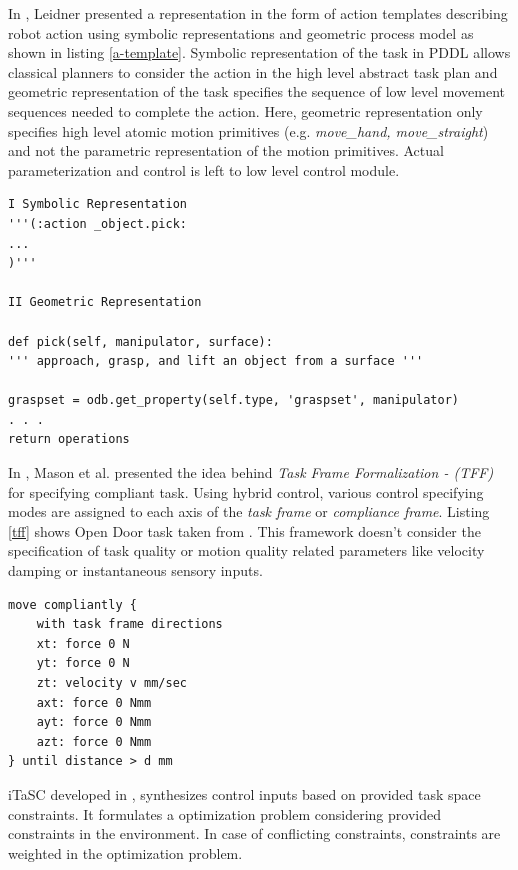 \documentclass[thesis]{mas_proposal}
\begin{document}
In \cite{leidner2017cognitive}, Leidner presented a representation in the form of action templates describing robot action using symbolic representations and geometric process model as shown in listing \ref{a-template}.  Symbolic representation of the task in PDDL allows classical planners to consider the action in the high level abstract task plan and geometric representation of the task specifies the sequence of low level movement sequences needed to complete the action. Here, geometric representation only specifies high level atomic motion primitives (e.g. \textit{move\_hand, move\_straight}) and not the parametric representation of the motion primitives. Actual parameterization and control is left to low level control module.   

\begin{lstlisting}[label=a-template,caption=Action Template: \_object.pick]
I Symbolic Representation 
'''(:action _object.pick: 
...
)'''

II Geometric Representation

def pick(self, manipulator, surface):
''' approach, grasp, and lift an object from a surface '''

graspset = odb.get_property(self.type, 'graspset', manipulator) 
. . .
return operations
\end{lstlisting}

In \cite{mason1981compliance}, Mason et al. presented the idea behind \textit{Task Frame Formalization - (TFF)} for specifying compliant task. Using hybrid control, various control specifying modes are assigned to each axis of the \textit{task frame} or \textit{compliance frame}\cite{nagele2018prototype}. Listing \ref{tff} shows Open Door task taken from \cite{bruyninckx1996specification}. This framework doesn't consider the specification of task quality or motion quality related parameters like velocity damping or instantaneous sensory inputs. 
\begin{lstlisting}[label=tff,caption=Task Specification using TFF: Open Door]
move compliantly {
	with task frame directions
	xt: force 0 N
	yt: force 0 N
	zt: velocity v mm/sec
	axt: force 0 Nmm
	ayt: force 0 Nmm
	azt: force 0 Nmm
} until distance > d mm 
\end{lstlisting}


iTaSC developed in \cite{DeSchutter-ijrr2007, DecreBruyninckxDeSchutter2013, decre09}, synthesizes control inputs based on provided task space constraints. It formulates a optimization problem considering provided constraints in the environment. In case of conflicting constraints, constraints are weighted in the optimization problem. 
\end{document}
